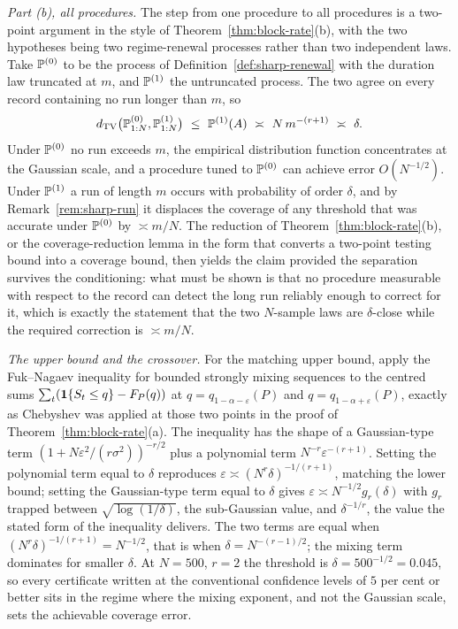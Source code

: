 \documentclass[../../../main.tex]{subfiles}
\begin{document}
\begin{route}
\emph{Part (b), all procedures.} The step from one procedure to all procedures is a two-point argument in the style of Theorem~\ref{thm:block-rate}(b), with the two hypotheses being two regime-renewal processes rather than two independent laws. Take $\mathbb{P}^{(0)}$ to be the process of Definition~\ref{def:sharp-renewal} with the duration law truncated at $m$, and $\mathbb{P}^{(1)}$ the untruncated process. The two agree on every record containing no run longer than $m$, so
\[
\dTV\big(\Prob^{(0)}_{1:N},\Prob^{(1)}_{1:N}\big)\ \le\ \Prob^{(1)}(A)\ \asymp\ N\,m^{-(r+1)}\ \asymp\ \delta .
\]
Under $\mathbb{P}^{(0)}$ no run exceeds $m$, the empirical distribution function concentrates at the Gaussian scale, and a procedure tuned to $\mathbb{P}^{(0)}$ can achieve error $O(N^{-1/2})$. Under $\mathbb{P}^{(1)}$ a run of length $m$ occurs with probability of order $\delta$, and by Remark~\ref{rem:sharp-run} it displaces the coverage of any threshold that was accurate under $\mathbb{P}^{(0)}$ by $\asymp m/N$. The reduction of Theorem~\ref{thm:block-rate}(b), or the coverage-reduction lemma \citep[Lemma~5]{halkiewicz2026} in the form that converts a two-point testing bound into a coverage bound, then yields the claim provided the separation survives the conditioning: what must be shown is that no procedure measurable with respect to the record can detect the long run reliably enough to correct for it, which is exactly the statement that the two $N$-sample laws are $\delta$-close while the required correction is $\asymp m/N$.

\emph{The upper bound and the crossover.} For the matching upper bound, apply the Fuk--Nagaev inequality for bounded strongly mixing sequences \citep[Ch.~6]{rio2017} to the centred sums $\sum_t(\mathbf{1}\{S_t\le q\}-F_P(q))$ at $q=q_{1-\alpha-\varepsilon}(P)$ and $q=q_{1-\alpha+\varepsilon}(P)$, exactly as Chebyshev was applied at those two points in the proof of Theorem~\ref{thm:block-rate}(a). The inequality has the shape of a Gaussian-type term $(1+N\varepsilon^2/(r\sigma^2))^{-r/2}$ plus a polynomial term $N^{-r}\varepsilon^{-(r+1)}$. Setting the polynomial term equal to $\delta$ reproduces $\varepsilon\asymp(N^r\delta)^{-1/(r+1)}$, matching the lower bound; setting the Gaussian-type term equal to $\delta$ gives $\varepsilon\asymp N^{-1/2}g_r(\delta)$ with $g_r$ trapped between $\sqrt{\log(1/\delta)}$, the sub-Gaussian value, and $\delta^{-1/r}$, the value the stated form of the inequality delivers. The two terms are equal when $(N^r\delta)^{-1/(r+1)}=N^{-1/2}$, that is when $\delta=N^{-(r-1)/2}$; the mixing term dominates for smaller $\delta$. At $N=500$, $r=2$ the threshold is $\delta=500^{-1/2}=0.045$, so every certificate written at the conventional confidence levels of $5$ per cent or better sits in the regime where the mixing exponent, and not the Gaussian scale, sets the achievable coverage error.
\end{route}
\end{document}
